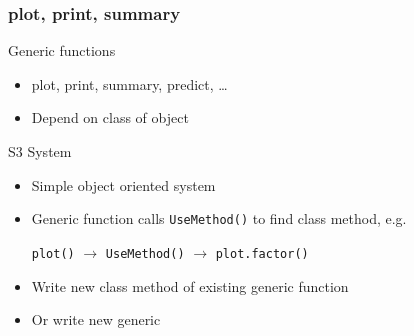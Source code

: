 \begin{frame}
	\frametitle{plot, print, summary}
	\begin{block}{Generic functions}
		\begin{itemize}
			\item plot, print, summary, predict, \dots
			\item Depend on \alert{class} of object
		\end{itemize}
	
		\begin{example}
		\end{example}
	\end{block}

	\begin{block}{S3 System}
		\begin{itemize}
			\item Simple object oriented system
			\item Generic function calls \texttt{UseMethod()} to find class method, e.g.
		 
		 		\texttt{plot()} $\rightarrow$ \texttt{UseMethod()} $\rightarrow$ \texttt{plot.factor()}
			\item Write new class method of existing generic function
			\item Or write new generic
		\end{itemize}
	
		\begin{example}
		\end{example}
	\end{block}
\end{frame}